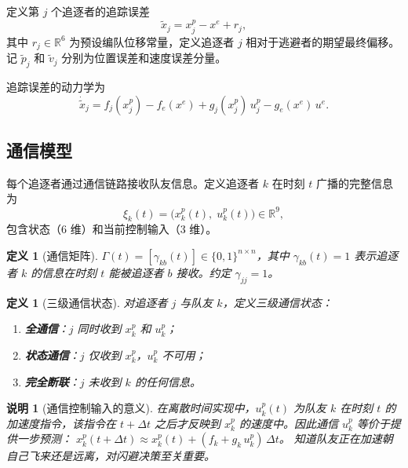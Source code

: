 \documentclass[12pt,a4paper]{ctexart}
\newtheorem{remark}[theorem]{说明}
\newtheorem{definition}[theorem]{定义}
\begin{document}
定义第 $j$ 个追逐者的追踪误差
\begin{equation}\label{eq:error}
\tilde{x}_j = x_j^p - x^e + r_j,
\end{equation}
其中 $r_j \in \mathbb{R}^6$ 为预设编队位移常量，定义追逐者 $j$ 相对于逃避者的期望最终偏移。记 $\tilde{p}_j$ 和 $\tilde{v}_j$ 分别为位置误差和速度误差分量。

追踪误差的动力学为
\begin{equation}\label{eq:error-dynamics}
\dot{\tilde{x}}_j = f_j(x_j^p) - f_e(x^e) + g_j(x_j^p)\,u_j^p - g_e(x^e)\,u^e.
\end{equation}

\subsection{通信模型}\label{sec:comm-model}

每个追逐者通过通信链路接收队友信息。定义追逐者 $k$ 在时刻 $t$ 广播的完整信息为
\begin{equation}\label{eq:comm-content}
\xi_k(t) = \bigl(x_k^p(t),\; u_k^p(t)\bigr) \in \mathbb{R}^9,
\end{equation}
包含状态（6 维）和当前控制输入（3 维）。

\begin{definition}[通信矩阵]\label{def:comm-matrix}
$\Gamma(t) = [\gamma_{kb}(t)] \in \{0,1\}^{n \times n}$，其中 $\gamma_{kb}(t) = 1$ 表示追逐者 $k$ 的信息在时刻 $t$ 能被追逐者 $b$ 接收。约定 $\gamma_{jj} = 1$。
\end{definition}

\begin{definition}[三级通信状态]\label{def:three-level}
对追逐者 $j$ 与队友 $k$，定义三级通信状态：
\begin{enumerate}[label=(\roman*)]
\item \textbf{全通信}：$j$ 同时收到 $x_k^p$ 和 $u_k^p$；
\item \textbf{状态通信}：$j$ 仅收到 $x_k^p$，$u_k^p$ 不可用；
\item \textbf{完全断联}：$j$ 未收到 $k$ 的任何信息。
\end{enumerate}
\end{definition}

\begin{remark}[通信控制输入的意义]
在离散时间实现中，$u_k^p(t)$ 为队友 $k$ 在时刻 $t$ 的加速度指令，该指令在 $t+\Delta t$ 之后才反映到 $x_k^p$ 的速度中。因此通信 $u_k^p$ 等价于提供一步预测：
$x_k^p(t+\Delta t) \approx x_k^p(t) + (f_k + g_k\,u_k^p)\,\Delta t$。
知道队友正在加速朝自己飞来还是远离，对闪避决策至关重要。
\end{remark}
\end{document}
